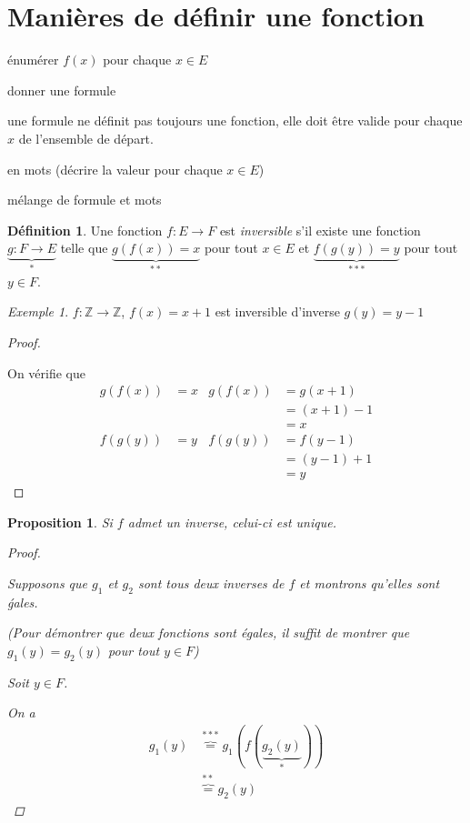 \documentclass{report}
\newcommand*{\entiers}{\mathbb{Z}}
\newtheorem*{prop}{Proposition}
\theoremstyle{definition}
\newtheorem*{defin}{D\'efinition}
\theoremstyle{remark}
\newtheorem*{exem}{Exemple}
\begin{document}
	\section*{Mani\`eres de d\'efinir une fonction}
	\begin{ulist}[noitemsep]
		\item \'enum\'erer $f(x)$ pour chaque $x \in E$
		\item donner une formule

		une formule ne d\'efinit pas toujours une fonction, elle doit \^etre valide pour chaque $x$ de l'ensemble de d\'epart.
		\item en mots (d\'ecrire la valeur pour chaque $x \in E$)
		\item m\'elange de formule et mots
	\end{ulist}

	\begin{defin}
		Une fonction $f:E \to F$ est \emph{inversible} s'il existe une fonction $\underbrace{g:F \to E}_{*}$ telle que $\underbrace{g(f(x))=x}_{**}$ pour tout $x \in E$ et $\underbrace{f(g(y))=y}_{***}$ pour tout $y \in F$.
	\end{defin}

	\begin{exem}
		$f:\entiers \to \entiers$, $f(x)=x+1$ est inversible d'inverse $g(y)=y-1$

		\begin{proof}
			~

			On v\'erifie que
			\begin{align*}
				g(f(x))&= x& g(f(x))&= g(x+1)\\
				&&&= (x+1)-1\\
				&&&= x\\
				f(g(y))&= y& f(g(y))&= f(y-1)\\
				&&&= (y-1)+1\\
				&&&= y
			\end{align*}
		\end{proof}
	\end{exem}

	\begin{prop}
		Si $f$ admet un inverse, celui-ci est unique.

		\begin{proof}
			~

			Supposons que $g_1$ et $g_2$ sont tous deux inverses de $f$ et montrons qu'elles sont \'gales.

			(Pour d\'emontrer que deux fonctions sont \'egales, il suffit de montrer que $g_1(y)=g_2(y)$ pour tout $y \in F$)

			Soit $y \in F$.

			On a
			\begin{align*}
				g_1(y)&\overbrace{=}^{***} g_1(f(\underbrace{g_2(y)}_{*}))\\
				&\overbrace{=}^{**} g_2(y)
			\end{align*}
		\end{proof}
	\end{prop}
\end{document}
